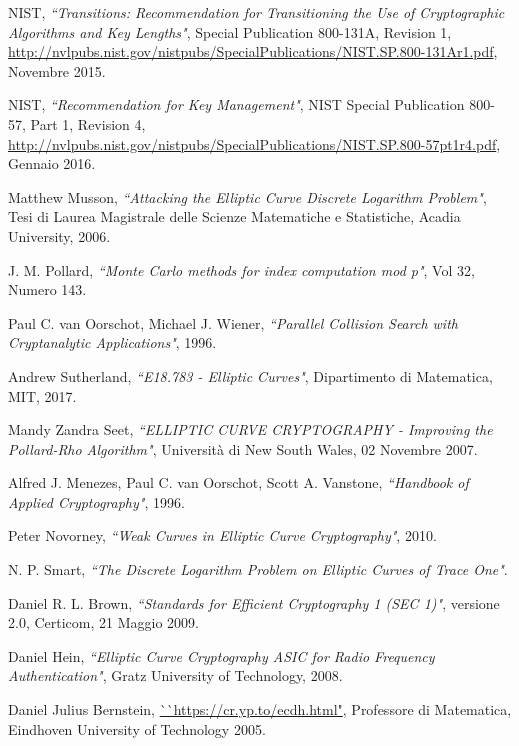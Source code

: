 \documentclass[a4paper,12pt]{tesiinfo}
\begin{document}
\begin{thebibliography}{99}
  NIST,
  \emph{``Transitions: Recommendation for Transitioning the Use of Cryptographic Algorithms and Key Lengths"},
  Special Publication 800-131A,
  Revision 1,
  \url{http://nvlpubs.nist.gov/nistpubs/SpecialPublications/NIST.SP.800-131Ar1.pdf},
  Novembre 2015.

  NIST,
  \emph{``Recommendation for Key Management"},
  NIST Special Publication 800-57,
  Part 1, Revision 4,
  \url{http://nvlpubs.nist.gov/nistpubs/SpecialPublications/NIST.SP.800-57pt1r4.pdf},
  Gennaio 2016.

  Matthew Musson,
  \emph{``Attacking the Elliptic Curve Discrete Logarithm Problem"},
  Tesi di Laurea Magistrale delle Scienze Matematiche e Statistiche,
  Acadia University,
  2006.
  
  J. M. Pollard,
  \emph{``Monte Carlo methods for index computation mod p"},
  Vol 32, Numero 143.

  Paul C. van Oorschot, Michael J. Wiener,
  \emph{``Parallel Collision Search with Cryptanalytic Applications"},
  1996.

  Andrew Sutherland,
  \emph{``E18.783 - Elliptic Curves"},
  Dipartimento di Matematica,
  MIT,
  2017.
  
  Mandy Zandra Seet,
  \emph{``ELLIPTIC CURVE CRYPTOGRAPHY - Improving the Pollard-Rho Algorithm"},
  Universit\`a di New South Wales,
  02 Novembre 2007.

  Alfred J. Menezes, Paul C. van Oorschot, Scott A. Vanstone,
  \emph{``Handbook of Applied Cryptography"},
  1996.
  
  Peter Novorney,
  \emph{``Weak Curves in Elliptic Curve Cryptography"},
  2010.

  N. P. Smart,
  \emph{``The Discrete Logarithm Problem on Elliptic Curves of Trace One"}.

  Daniel R. L. Brown,
  \emph{``Standards for Efficient Cryptography 1 (SEC 1)"},
  versione 2.0,
  Certicom, 
  21 Maggio 2009.
  
  Daniel Hein,
  \emph{``Elliptic Curve Cryptography ASIC for Radio Frequency Authentication"},
Gratz University of Technology,
  2008.

  Daniel Julius Bernstein,
  \url{``https://cr.yp.to/ecdh.html"},
Professore di Matematica,
Eindhoven University of Technology
  2005.
  

\end{thebibliography}
\end{document}
